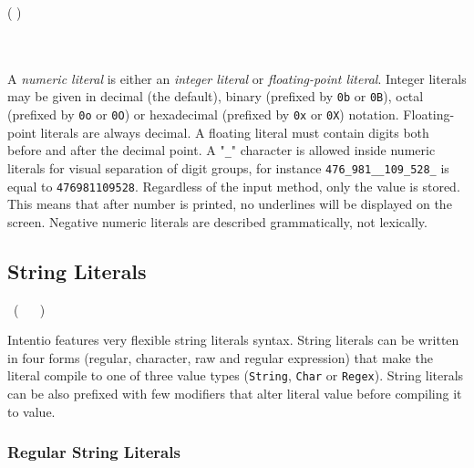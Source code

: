 \begin{bnf}
   \eq (  \gor {} ) \ \gtry{ \term{+} \gor \term{-} } \ \gmany{\term{\_}} \  \\
  \\
   \eq    {} \  \  \ 
             \gorln {} \ 
\end{bnf}

A \emph{numeric literal} is either an \emph{integer literal} or \emph{floating-point literal}. Integer literals may be given in decimal (the default), binary (prefixed by \texttt{0b} or \texttt{0B}), octal (prefixed by \texttt{0o} or \texttt{0O}) or hexadecimal (prefixed by \texttt{0x} or \texttt{0X}) notation. Floating-point literals are always decimal. A floating literal must contain digits both before and after the decimal point. A "\texttt{\_}" character is allowed inside numeric literals for visual separation of digit groups, for instance \lstinline{476_981__109_528_} is equal to \lstinline{476981109528}. Regardless of the input method, only the value is stored. This means that after number is printed, no underlines will be displayed on the screen. Negative numeric literals are described grammatically, not lexically.

\subsection{String Literals}

\begin{bnf}
   \eq {} \ ( \  \gor {} \gor {} \gor {} \ )
\end{bnf}

Intentio features very flexible string literals syntax. String literals can be written in four forms (regular, character, raw and regular expression) that make the literal compile to one of three value types (\lstinline{String}, \lstinline{Char} or \lstinline{Regex}). String literals can be also prefixed with few modifiers that alter literal value before compiling it to value.

\subsubsection*{Regular String Literals}

